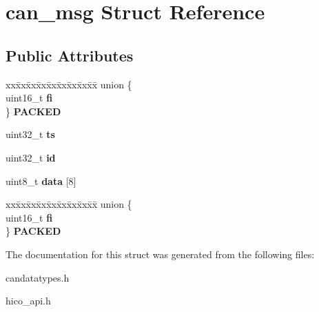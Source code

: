 \hypertarget{structcan__msg}{}\section{can\+\_\+msg Struct Reference}
\label{structcan__msg}
\subsection*{Public Attributes}
\begin{DoxyCompactItemize}
\item 
\mbox{\label{structcan__msg_a233f7f010cc90ec3d453bcb75d66c14e}} 
\begin{tabbing}
xx\=xx\=xx\=xx\=xx\=xx\=xx\=xx\=xx\=\kill
union \{\\
\>uint16\_t {\bfseries fi}\\
\} {\bfseries PACKED}\\

\end{tabbing}\item 
\mbox{\label{structcan__msg_a157aaad2daf039f59606522c6a51663a}} 
uint32\+\_\+t {\bfseries ts}
\item 
\mbox{\label{structcan__msg_a9a5f820883d3dfe1f0c6bc33c3f95989}} 
uint32\+\_\+t {\bfseries id}
\item 
\mbox{\label{structcan__msg_ac0dab268ebadaa9521b4d535c03f13d8}} 
uint8\+\_\+t {\bfseries data} \mbox{[}8\mbox{]}
\item 
\mbox{\label{structcan__msg_a11a48cac095afd9250fe22fa37929aec}} 
\begin{tabbing}
xx\=xx\=xx\=xx\=xx\=xx\=xx\=xx\=xx\=\kill
union \{\\
\>uint16\_t {\bfseries fi}\\
\} {\bfseries PACKED}\\

\end{tabbing}\end{DoxyCompactItemize}


The documentation for this struct was generated from the following files\+:\begin{DoxyCompactItemize}
\item 
candatatypes.\+h\item 
hico\+\_\+api.\+h\end{DoxyCompactItemize}
